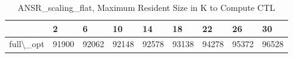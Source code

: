 \begin{table}
\centering
\caption{ANSR\_scaling\_flat, Maximum Resident Size in K to Compute CTL}
\label{ANSR_scaling_flat_CTL_size}
\begin{tabular}{lllllllll}
\toprule
{} &      2 &      6 &     10 &     14 &     18 &     22 &     26 &     30 \\
\midrule
full\textbackslash \_opt &  91900 &  92062 &  92148 &  92578 &  93138 &  94278 &  95372 &  96528 \\
\bottomrule
\end{tabular}
\end{table}
